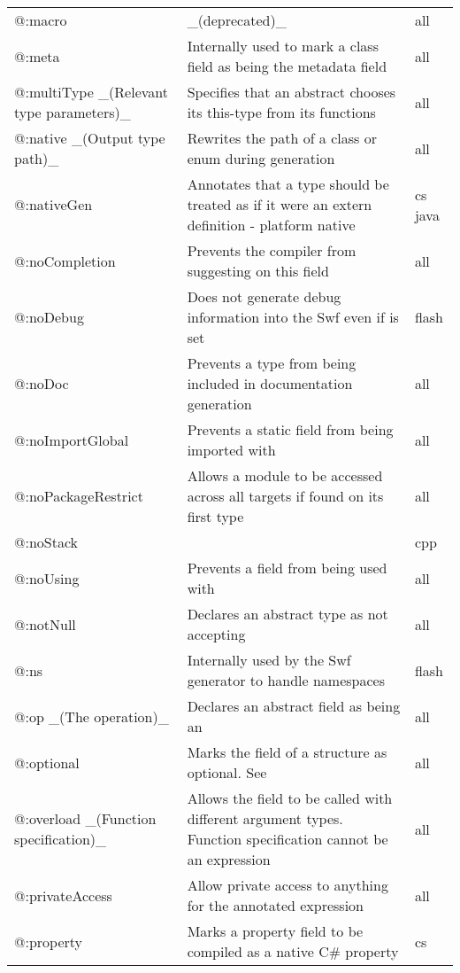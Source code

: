 \begin{center}
\begin{tabular}{| l | l | l |}
	@:macro  &  \_(deprecated)\_  &  all \\
	@:meta   &  Internally used to mark a class field as being the metadata field  &  all \\
	@:multiType \_(Relevant type parameters)\_  &  Specifies that an abstract chooses its this-type from its \expr{@:to} functions  &  all \\
	@:native \_(Output type path)\_  &  Rewrites the path of a class or enum during generation  &  all \\
	@:nativeGen  &  Annotates that a type should be treated as if it were an extern definition - platform native  &  cs  java \\
	@:noCompletion  &  Prevents the compiler from suggesting \tref{completion}{cr-completion} on this field  &  all \\
	@:noDebug &  Does not generate debug information into the Swf even if \expr{-debug} is set   &  flash \\
	@:noDoc  &  Prevents a type from being included in documentation generation  &  all \\
	@:noImportGlobal  &  Prevents a static field from being imported with \expr{import Class.*}  &  all \\
	@:noPackageRestrict  &  Allows a module to be accessed across all targets if found on its first type  &  all \\
	@:noStack &     &  cpp \\
	@:noUsing &  Prevents a field from being used with \expr{using}  &  all \\
	@:notNull &  Declares an abstract type as not accepting \tref{\expr{null} values}{types-nullability}  &  all \\
	@:ns  &  Internally used by the Swf generator to handle namespaces   &  flash \\
	@:op \_(The operation)\_  &   Declares an abstract field as being an \tref{operator overload}{types-abstract-operator-overloading}  &  all \\
	@:optional  &  Marks the field of a structure as optional. See \tref{Optional Arguments}{types-nullability-optional-arguments}  &  all \\
	@:overload \_(Function specification)\_  &  Allows the field to be called with different argument types. Function specification cannot be an expression  &  all \\
	@:privateAccess  &  Allow private access to anything for the annotated expression  &  all \\
	@:property  &  Marks a property field to be compiled as a native C\# property   &  cs \\

\end{tabular}
\end{center}
